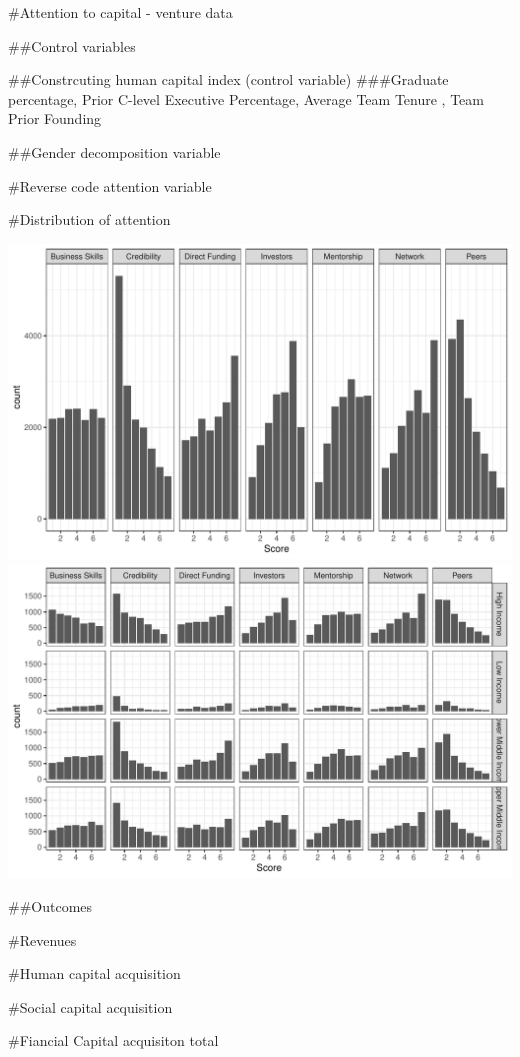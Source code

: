 \documentclass[
  english,
  man]{apa6}
\begin{document}
\#Attention to capital - venture data

\#\#Control variables

\#\#Constrcuting human capital index (control variable)
\#\#\#Graduate percentage, Prior C-level Executive Percentage, Average Team Tenure , Team Prior Founding

\#\#Gender decomposition variable

\#Reverse code attention variable

\#Distribution of attention

\includegraphics{Manuscript_files/figure-latex/unnamed-chunk-6-1.pdf} \includegraphics{Manuscript_files/figure-latex/unnamed-chunk-6-2.pdf}

\#\#Outcomes

\#Revenues

\#Human capital acquisition

\#Social capital acquisition

\#Fiancial Capital acquisiton total
\end{document}
